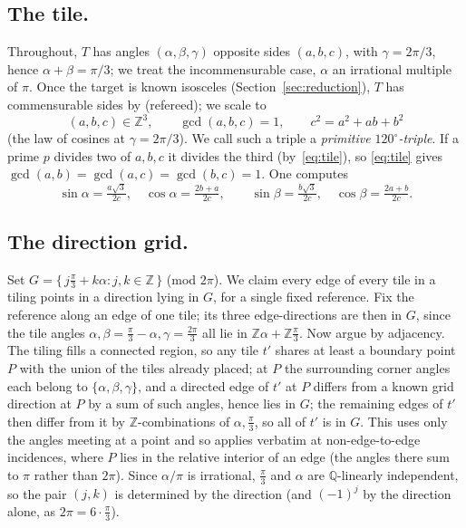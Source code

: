 \documentclass[11pt,reqno]{amsart}
\theoremstyle{plain}
\theoremstyle{definition}
\newcommand{\Z}{\mathbb{Z}}
\newcommand{\Q}{\mathbb{Q}}
\begin{document}
\subsection*{The tile.}
Throughout, $T$ has angles $(\alpha,\beta,\gamma)$ opposite sides $(a,b,c)$, with
$\gamma=2\pi/3$, hence $\alpha+\beta=\pi/3$; we treat the incommensurable case, $\alpha$ an
irrational multiple of $\pi$. Once the target is known isosceles
(Section~\ref{sec:reduction}), $T$ has commensurable sides by \cite[Thm.~12.5]{BeesonIso}
(refereed); we scale to
\begin{equation}\label{eq:tile}
(a,b,c)\in\Z^3,\qquad \gcd(a,b,c)=1,\qquad c^2=a^2+ab+b^2
\end{equation}
(the law of cosines at $\gamma=2\pi/3$). We call such a triple a \emph{primitive $120^\circ$-triple}.
If a prime $p$ divides two of $a,b,c$ it divides the third (by~\eqref{eq:tile}), so
\eqref{eq:tile} gives $\gcd(a,b)=\gcd(a,c)=\gcd(b,c)=1$. One computes
\begin{equation}\label{eq:trig}
\sin\alpha=\tfrac{a\sqrt3}{2c},\quad \cos\alpha=\tfrac{2b+a}{2c},\qquad
\sin\beta=\tfrac{b\sqrt3}{2c},\quad \cos\beta=\tfrac{2a+b}{2c}.
\end{equation}

\subsection*{The direction grid.}
Set $G=\{\,j\frac\pi3+k\alpha:j,k\in\Z\,\}$ (mod $2\pi$). We claim every edge of every tile in a
tiling points in a direction lying in $G$, for a single fixed reference. Fix the reference along an
edge of one tile; its three edge-directions are then in $G$, since the tile angles
$\alpha,\beta=\frac\pi3-\alpha,\gamma=\frac{2\pi}3$ all lie in $\Z\alpha+\Z\frac\pi3$. Now argue by
adjacency. The tiling fills a connected region, so any tile $t'$ shares at least a boundary point
$P$ with the union of the tiles already placed; at $P$ the surrounding corner angles each belong to
$\{\alpha,\beta,\gamma\}$, and a directed edge of $t'$ at $P$ differs from a known grid direction at
$P$ by a sum of such angles, hence lies in $G$; the remaining edges of $t'$ then differ from it by
$\Z$-combinations of $\alpha,\frac\pi3$, so all of $t'$ is in $G$. This uses only the angles meeting
at a point and so applies verbatim at non-edge-to-edge incidences, where $P$ lies in the relative
interior of an edge (the angles there sum to $\pi$ rather than $2\pi$). Since $\alpha/\pi$ is
irrational, $\frac\pi3$ and $\alpha$ are $\Q$-linearly independent, so the pair $(j,k)$ is
determined by the direction (and $(-1)^j$ by the direction alone, as $2\pi=6\cdot\frac\pi3$).
\end{document}

